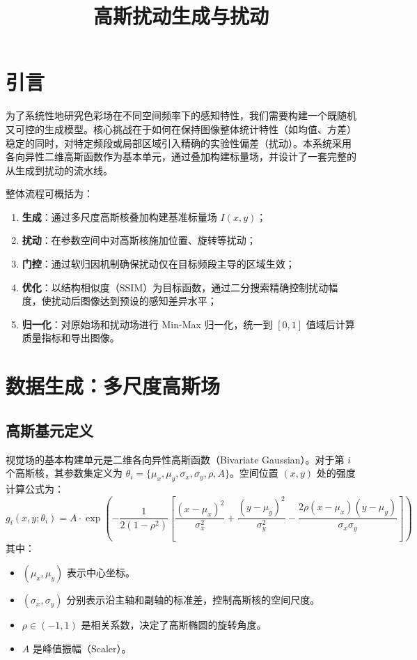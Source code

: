 \documentclass{article}
\title{高斯扰动生成与扰动}
\begin{document}
\maketitle

\section{引言}
为了系统性地研究色彩场在不同空间频率下的感知特性，我们需要构建一个既随机又可控的生成模型。核心挑战在于如何在保持图像整体统计特性（如均值、方差）稳定的同时，对特定频段或局部区域引入精确的实验性偏差（扰动）。本系统采用各向异性二维高斯函数作为基本单元，通过叠加构建标量场，并设计了一套完整的从生成到扰动的流水线。

整体流程可概括为：
\begin{enumerate}
    \item \textbf{生成}：通过多尺度高斯核叠加构建基准标量场 $I(x,y)$；
    \item \textbf{扰动}：在参数空间中对高斯核施加位置、旋转等扰动；
    \item \textbf{门控}：通过软归因机制确保扰动仅在目标频段主导的区域生效；
    \item \textbf{优化}：以结构相似度（SSIM）为目标函数，通过二分搜索精确控制扰动幅度，使扰动后图像达到预设的感知差异水平；
    \item \textbf{归一化}：对原始场和扰动场进行 Min-Max 归一化，统一到 $[0, 1]$ 值域后计算质量指标和导出图像。
\end{enumerate}

\section{数据生成：多尺度高斯场}
\subsection{高斯基元定义}
视觉场的基本构建单元是二维各向异性高斯函数（Bivariate Gaussian）。对于第 $i$ 个高斯核，其参数集定义为 $\theta_i = \{\mu_x, \mu_y, \sigma_x, \sigma_y, \rho, A\}$。空间位置 $(x, y)$ 处的强度计算公式为：
\begin{equation}
g_i(x, y; \theta_i) = A \cdot \exp\left( -\frac{1}{2(1-\rho^2)} \left[ \frac{(x-\mu_x)^2}{\sigma_x^2} + \frac{(y-\mu_y)^2}{\sigma_y^2} - \frac{2\rho(x-\mu_x)(y-\mu_y)}{\sigma_x \sigma_y} \right] \right)
\end{equation}
其中：
\begin{itemize}
    \item $(\mu_x, \mu_y)$ 表示中心坐标。
    \item $(\sigma_x, \sigma_y)$ 分别表示沿主轴和副轴的标准差，控制高斯核的空间尺度。
    \item $\rho \in (-1, 1)$ 是相关系数，决定了高斯椭圆的旋转角度。
    \item $A$ 是峰值振幅（Scaler）。
\end{itemize}
\end{document}
